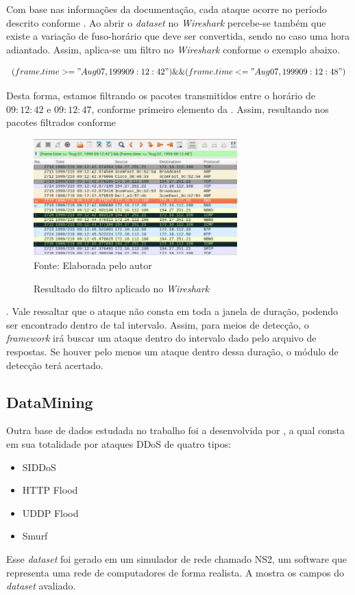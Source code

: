  Com base nas informações da documentação, cada ataque ocorre no período descrito conforme .  Ao abrir o \textit{dataset} no \textit{Wireshark} percebe-se também que existe a variação de fuso-horário que deve ser convertida, sendo no caso uma hora adiantado. Assim, aplica-se um filtro no \textit{Wireshark} conforme o exemplo abaixo.
 
 \begin{equation}
 	(frame.time >= "Aug 07, 1999 09:12:42") \&\& (frame.time <= "Aug 07, 1999 09:12:48")
 \end{equation} 
 
 Desta forma, estamos filtrando os pacotes transmitidos entre o horário de $09:12:42$ e $09:12:47$, conforme primeiro elemento da . Assim, resultando nos pacotes filtrados conforme 

 \begin{figure}[ht]
 	\centering
 	\caption{Resultado do filtro aplicado no \textit{Wireshark} }
 	\includegraphics[width=0.7\textwidth]{figs/filtWireshark1.png}\\
 	{Fonte: Elaborada pelo autor}
 	\label{fig:wiresharkFilt}
 \end{figure} 
.
Vale ressaltar que o ataque não consta em toda a janela de duração, podendo ser encontrado dentro de tal intervalo. Assim, para meios de detecção, o \textit{framework} irá buscar um ataque dentro do intervalo dado pelo arquivo de respostas. Se houver pelo menos um ataque dentro dessa duração, o módulo de detecção terá acertado.
\subsection{DataMining}
Outra base de dados estudada no trabalho foi a desenvolvida por \cite{DataMining}, a qual consta em sua totalidade por ataques DDoS de quatro tipos:
\begin{itemize}
	\item SIDDoS
	\item HTTP Flood
	\item UDDP Flood
	\item Smurf
\end{itemize}
Esse \textit{dataset} foi gerado em um simulador de rede chamado NS2, um software que representa uma rede de computadores de forma realista. 
A  mostra os campos do \textit{dataset} avaliado. 

